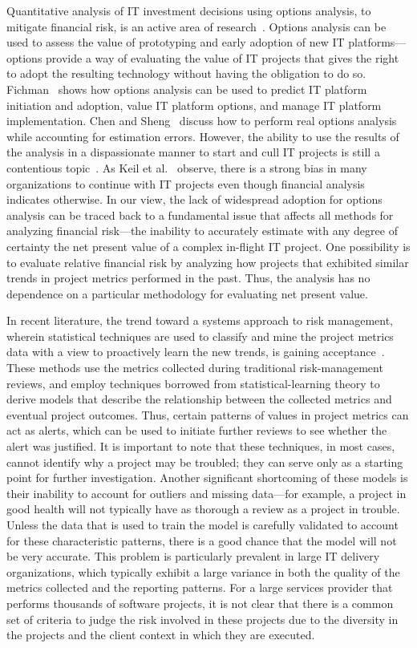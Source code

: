 Quantitative analysis of IT investment decisions using options analysis, to
mitigate financial risk, is an active area of
research~\cite{risk14,risk15,risk16}. Options analysis can be used to assess the
value of prototyping and early adoption of new IT platforms---options provide a
way of evaluating the value of IT projects that gives the right to adopt the
resulting technology without having the obligation to do
so. Fichman~\cite{risk14} shows how options analysis can be used to predict IT
platform initiation and adoption, value IT platform options, and manage IT
platform implementation. Chen and Sheng~\cite{risk15} discuss how to perform
real options analysis while accounting for estimation errors. However, the
ability to use the results of the analysis in a dispassionate manner to start
and cull IT projects is still a contentious topic~\cite{risk17}. As Keil et
al.~\cite{risk18} observe, there is a strong bias in many organizations to
continue with IT projects even though financial analysis indicates otherwise. In
our view, the lack of widespread adoption for options analysis can be traced
back to a fundamental issue that affects all methods for analyzing financial
risk---the inability to accurately estimate with any degree of certainty the net
present value of a complex in-flight IT project. One possibility is to evaluate
relative financial risk by analyzing how projects that exhibited similar trends
in project metrics performed in the past. Thus, the analysis has no dependence
on a particular methodology for evaluating net present value.

In recent literature, the trend toward a systems approach to risk management,
wherein statistical techniques are used to classify and mine the project metrics
data with a view to proactively learn the new trends, is gaining
acceptance~\cite{risk8,risk9,risk10}.  These methods use the metrics collected
during traditional risk-management reviews, and employ techniques borrowed from
statistical-learning theory to derive models that describe the relationship
between the collected metrics and eventual project outcomes. Thus, certain
patterns of values in project metrics can act as alerts, which can be used to
initiate further reviews to see whether the alert was justified. It is important
to note that these techniques, in most cases, cannot identify why a project may
be troubled; \ie they can serve only as a starting point for further
investigation.  Another significant shortcoming of these models is their
inability to account for outliers and missing data---for example, a project in
good health will not typically have as thorough a review as a project in
trouble. Unless the data that is used to train the model is carefully validated
to account for these characteristic patterns, there is a good chance that the
model will not be very accurate. This problem is particularly prevalent in large
IT delivery organizations, which typically exhibit a large variance in both the
quality of the metrics collected and the reporting patterns. For a large
services provider that performs thousands of software projects, it is not clear
that there is a common set of criteria to judge the risk involved in these
projects due to the diversity in the projects and the client context in which
they are executed.

